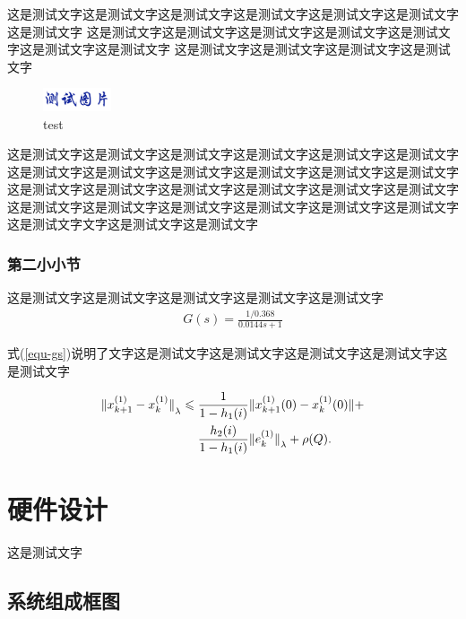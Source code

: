 \documentclass[UTF8,zihao=-4,twoside]{ctexart}
\theoremstyle{thmstyle}
\newcommand{\sect}[1]{\vfill\clearpage\setcounter{figure}{0}\setcounter{table}{0}\setcounter{equation}{0}\section{#1}}
\newcommand{\figstyle}{\centering\vspace{-0.1cm}\setlength{\abovecaptionskip}{0.2cm}\setlength{\belowcaptionskip}{-0.5cm}}
\newcommand{\equstyle}{\setlength\abovedisplayskip{6pt}\setlength\belowdisplayskip{-6pt}}
\begin{document}
            这是测试文字这是测试文字这是测试文字这是测试文字这是测试文字这是测试文字这是测试文字
            这是测试文字这是测试文字这是测试文字这是测试文字这是测试文字这是测试文字这是测试文字
            这是测试文字这是测试文字这是测试文字这是测试文字

            \begin{figure}
                \figstyle
                \vspace{-12pt}
                \includegraphics [width=0.18\textwidth]{figures/test.png}
                \caption{test}
            \end{figure}

            这是测试文字这是测试文字这是测试文字这是测试文字这是测试文字这是测试文字这是测试文字这是测试文字这是测试文字这是测试文字这是测试文字这是测试文字这是测试文字这是测试文字这是测试文字这是测试文字这是测试文字这是测试文字这是测试文字这是测试文字这是测试文字这是测试文字这是测试文字这是测试文字这是测试文字文字这是测试文字这是测试文字
            \subsubsection{第二小小节}
            这是测试文字这是测试文字这是测试文字这是测试文字这是测试文字
                {\equstyle
                \begin{align}
                    G(s)=\frac{1/0.368}{0.0144s+1}
                    \label{equ-gs}
                \end{align}}

            式(\ref{equ-gs})说明了文字这是测试文字这是测试文字这是测试文字这是测试文字这是测试文字
            
             \begin{align}
            {\Arrowvert x^{(1)}_{k+1}-x^{(1)}_k\Arrowvert}_\lambda\leqslant \;&
            \frac{1}{1-h_1(i)}\Arrowvert x^{(1)}_{k+1}(0)-x^{(1)}_k(0)\Arrowvert+\notag\\
            &\frac{h_2(i)}{1-h_1(i)}{\Arrowvert
            	e^{(1)}_k\Arrowvert}_\lambda+\rho(Q).
            \end{align}
            
    \sect{硬件设计}
    这是测试文字
        \subsection{系统组成框图}
           
\end{document}
